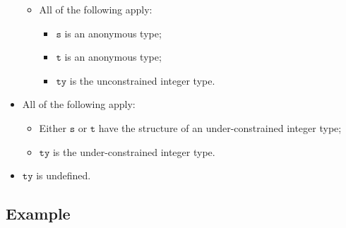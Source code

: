 \documentclass{book}
\newcommand\vt[0]{\texttt{t}}
\newcommand\vs[0]{\texttt{s}}
\newcommand\tty[0]{\texttt{ty}}
\begin{document}
\begin{itemize}
\begin{itemize}
      \item All of the following apply:
        \begin{itemize}
        \item $\vs$ is an anonymous type;
        \item $\vt$ is an anonymous type;
	\item $\tty$ is the unconstrained integer type.
        \end{itemize}
    \end{itemize}

  \item All of the following apply:
    \begin{itemize}
    \item Either $\vs$ or $\vt$ have the structure of an under-constrained integer type;
    \item $\tty$ is the under-constrained integer type.
    \end{itemize}

  \item $\tty$ is undefined.
  \end{itemize}

\subsection{Example}

\end{document}
